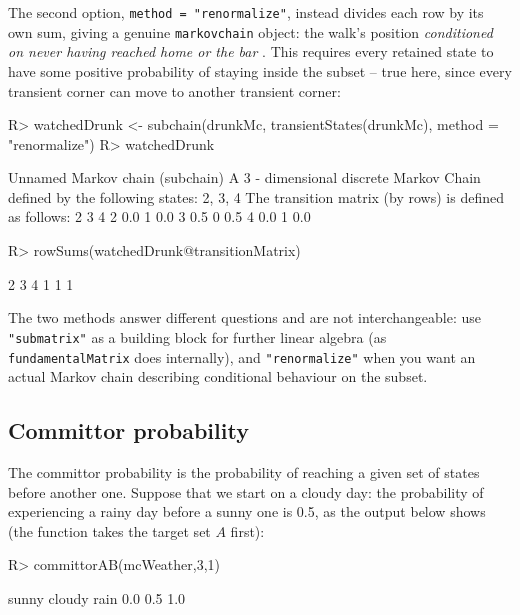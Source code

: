 \documentclass[
  nojss]{jss}
\begin{document}
The second option, \texttt{method\ =\ "renormalize"}, instead divides each row by
its own sum, giving a genuine \texttt{markovchain} object: the walk's position
\emph{conditioned on never having reached home or the bar} \citep{NorrisBook}.
This requires every retained state to have some positive probability of
staying inside the subset -- true here, since every transient corner can
move to another transient corner:

\begin{CodeChunk}
\begin{CodeInput}
R> watchedDrunk <- subchain(drunkMc, transientStates(drunkMc), method = "renormalize")
R> watchedDrunk
\end{CodeInput}
\begin{CodeOutput}
Unnamed Markov chain (subchain) 
 A  3 - dimensional discrete Markov Chain defined by the following states: 
 2, 3, 4 
 The transition matrix  (by rows)  is defined as follows: 
    2 3   4
2 0.0 1 0.0
3 0.5 0 0.5
4 0.0 1 0.0
\end{CodeOutput}
\begin{CodeInput}
R> rowSums(watchedDrunk@transitionMatrix)
\end{CodeInput}
\begin{CodeOutput}
2 3 4 
1 1 1 
\end{CodeOutput}
\end{CodeChunk}

The two methods answer different questions and are not interchangeable: use
\texttt{"submatrix"} as a building block for further linear algebra (as
\texttt{fundamentalMatrix} does internally), and \texttt{"renormalize"} when you want an
actual Markov chain describing conditional behaviour on the subset.

\subsection{Committor probability}\label{committor-probability}

The committor probability is the probability of reaching a given set of states before another one.
Suppose that we start on a cloudy day: the probability of experiencing a rainy day before
a sunny one is 0.5, as the output below shows (the function takes the target set \(A\) first):

\begin{CodeChunk}
\begin{CodeInput}
R> committorAB(mcWeather,3,1)
\end{CodeInput}
\begin{CodeOutput}
 sunny cloudy   rain 
   0.0    0.5    1.0 
\end{CodeOutput}
\end{CodeChunk}
\end{document}
